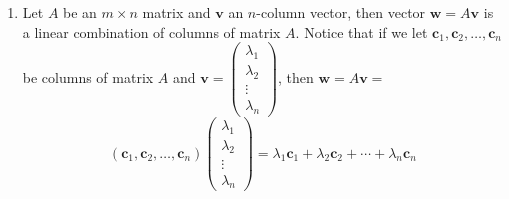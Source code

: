 \documentclass{report}
\begin{document}
{\begin{enumerate}
\item Let $A$ be an $m \times n$ matrix and $\mathbf{v}$ an $n$-column vector, then vector $\mathbf{w}=A \mathbf{v}$ is a linear combination of columns of matrix $A$.
Notice that if we let $\mathbf{c}_1, \mathbf{c}_2, \ldots, \mathbf{c}_n$ be columns of matrix $A$ and $\mathbf{v}=\left(\begin{array}{c}\lambda_1 \\ \lambda_2 \\ \vdots \\ \lambda_n\end{array}\right)$, then $\mathbf{w}=A \mathbf{v}=$
$$
\left(\mathbf{c}_1, \mathbf{c}_2, \ldots, \mathbf{c}_n\right)\left(\begin{array}{c}
\lambda_1 \\
\lambda_2 \\
\vdots \\
\lambda_n
\end{array}\right)=\lambda_1 \mathbf{c}_1+\lambda_2 \mathbf{c}_2+\cdots+\lambda_n \mathbf{c}_n
$$
\end{enumerate}

}



\end{document}
